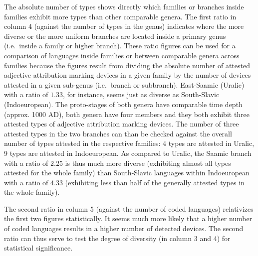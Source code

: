 The absolute number of types shows directly which families or branches inside families exhibit more types than other comparable genera. The first ratio in column 4 (against the number of types in the genus) indicates where the more diverse or the more uniform branches are located inside a primary genus (i.e.~inside a family or higher branch). These ratio figures can be used for a comparison of languages inside families or between comparable genera across families because the figures result from dividing the absolute number of  attested adjective attribution marking devices in a given family by the number of devices attested in a given sub-genus (i.e.~branch or subbranch). East-Saamic (Uralic) with a ratio of $1.33$, for instance, seems just as diverse as South-Slavic (Indoeuropean). The proto-stages of both genera have comparable time depth (approx. 1000 AD), both genera have four members and they both exhibit three attested types of adjective attribution marking devices. The number of three attested types in the two branches can than be checked against the overall number of types attested in the respective families: 4 types are attested in Uralic, 9 types are attested in Indoeuropean. As compared to Uralic, the Saamic branch with a ratio of $2.25$ is thus much more diverse (exhibiting almost all types attested for the whole family) than South-Slavic languages within Indoeuropean with a ratio of $4.33$ (exhibiting less than half of the generally attested types in the whole family).

The second ratio in column 5 (against the number of coded languages) relativizes the first two figures statistically. It seems much more likely that a higher number of coded languages results in a higher number of detected devices. The second ratio can thus serve to test the degree of diversity (in column 3 and 4) for statistical significance. 

